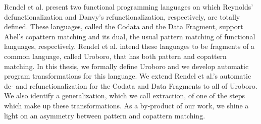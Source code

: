 % 
% 
%
Rendel et al. present two functional programming languages on which Reynolds' defunctionalization and Danvy's refunctionalization, respectively, are totally defined. These languages, called the Codata and the Data Fragment, support Abel's copattern matching and its dual, the usual pattern matching of functional languages, respectively. Rendel et al. intend these languages to be fragments of a common language, called Uroboro, that has both pattern and copattern matching. In this thesis, we formally define Uroboro and we develop automatic program transformations for this language. We extend Rendel et al.'s automatic de- and refunctionalization for the Codata and Data Fragments to all of Uroboro. We also identify a generalization, which we call extraction, of one of the steps which make up these transformations. As a by-product of our work, we shine a light on an asymmetry between pattern and copattern matching.
